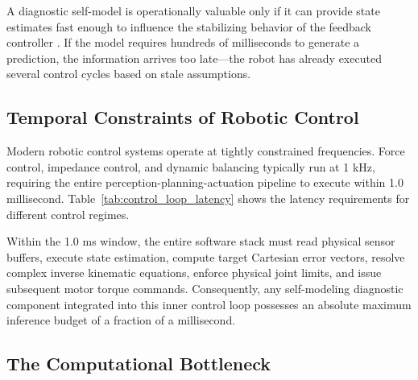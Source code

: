 ﻿\documentclass[12pt,a4paper,oneside]{report}
\begin{document}
A diagnostic self-model is operationally valuable only if it can provide state estimates fast enough to influence the stabilizing behavior of the feedback controller \cite{hu2024teaching, hu2025learning}. If the model requires hundreds of milliseconds to generate a prediction, the information arrives too late---the robot has already executed several control cycles based on stale assumptions.

\subsection{Temporal Constraints of Robotic Control}

Modern robotic control systems operate at tightly constrained frequencies. Force control, impedance control, and dynamic balancing typically run at 1 kHz, requiring the entire perception-planning-actuation pipeline to execute within 1.0 millisecond. Table~\ref{tab:control_loop_latency} shows the latency requirements for different control regimes.

\begin{table}[H]
\centering
\caption{Latency requirements for robotic control loops at different frequencies.}
\label{tab:control_loop_latency}
\end{table}

Within the 1.0 ms window, the entire software stack must read physical sensor buffers, execute state estimation, compute target Cartesian error vectors, resolve complex inverse kinematic equations, enforce physical joint limits, and issue subsequent motor torque commands. Consequently, any self-modeling diagnostic component integrated into this inner control loop possesses an absolute maximum inference budget of a fraction of a millisecond.

\subsection{The Computational Bottleneck}
\end{document}
